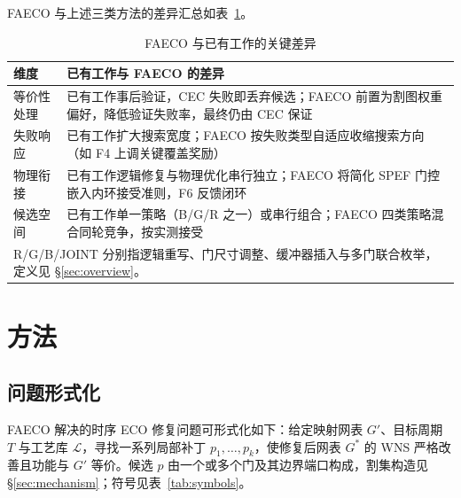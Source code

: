 \documentclass[twocolumn,10pt]{ctexart}
\begin{document}
FAECO 与上述三类方法的差异汇总如表~\ref{tab:related_diff}。

\begin{table}[!t]
\centering
\caption{FAECO 与已有工作的关键差异}
\label{tab:related_diff}
\footnotesize
\setlength{\tabcolsep}{2pt}
\begin{tabular}{p{1.3cm}p{6.0cm}}
\toprule
\textbf{维度} & \textbf{已有工作与 FAECO 的差异} \\
\midrule
等价性处理 & 已有工作事后验证，CEC 失败即丢弃候选；FAECO 前置为割图权重偏好，降低验证失败率，最终仍由 CEC 保证 \\
失败响应 & 已有工作扩大搜索宽度；FAECO 按失败类型自适应收缩搜索方向（如 F4 上调关键覆盖奖励） \\
物理衔接 & 已有工作逻辑修复与物理优化串行独立；FAECO 将简化 SPEF 门控嵌入内环接受准则，F6 反馈闭环 \\
候选空间 & 已有工作单一策略（B/G/R 之一）或串行组合；FAECO 四类策略混合同轮竞争，按实测接受 \\
\bottomrule
\multicolumn{2}{p{7.0cm}}{\footnotesize R/G/B/JOINT 分别指逻辑重写、门尺寸调整、缓冲器插入与多门联合枚举，定义见 \S\ref{sec:overview}。}\\
\end{tabular}
\end{table}

\section{方法}

\subsection{问题形式化}
FAECO 解决的时序 ECO 修复问题可形式化如下：给定映射网表 $G'$、目标周期 $T$ 与工艺库 $\mathcal{L}$，寻找一系列局部补丁 $p_1,\dots,p_k$，使修复后网表 $G^*$ 的 WNS 严格改善且功能与 $G'$ 等价。候选 $p$ 由一个或多个门及其边界端口构成，割集构造见 \S\ref{sec:mechanism}；符号见表~\ref{tab:symbols}。
\end{document}
